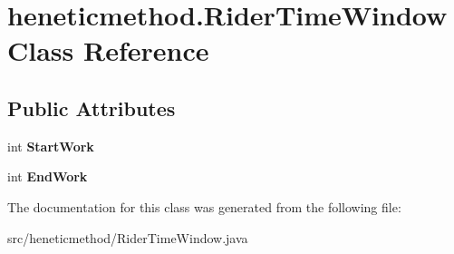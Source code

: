 \hypertarget{classheneticmethod_1_1_rider_time_window}{}\section{heneticmethod.\+Rider\+Time\+Window Class Reference}
\label{classheneticmethod_1_1_rider_time_window}
\subsection*{Public Attributes}
\begin{DoxyCompactItemize}
\item 
int {\bfseries Start\+Work}\hypertarget{classheneticmethod_1_1_rider_time_window_a9ade63256a1f8a01a7399003b3a1cd6b}{}\label{classheneticmethod_1_1_rider_time_window_a9ade63256a1f8a01a7399003b3a1cd6b}

\item 
int {\bfseries End\+Work}\hypertarget{classheneticmethod_1_1_rider_time_window_a732f79a0ee367742c3aa04493cde24d5}{}\label{classheneticmethod_1_1_rider_time_window_a732f79a0ee367742c3aa04493cde24d5}

\end{DoxyCompactItemize}


The documentation for this class was generated from the following file\+:\begin{DoxyCompactItemize}
\item 
src/heneticmethod/Rider\+Time\+Window.\+java\end{DoxyCompactItemize}

